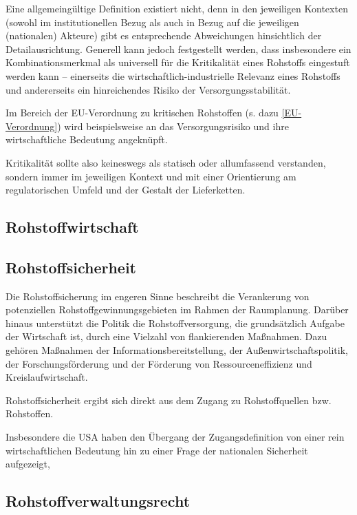 \documentclass[12pt,a4paper,oneside]{book} %
\begin{document}
	Eine allgemeingültige Definition existiert nicht, denn in den jeweiligen Kontexten (sowohl im institutionellen Bezug als auch in Bezug auf die jeweiligen (nationalen) Akteure) gibt es entsprechende Abweichungen hinsichtlich der Detailausrichtung. Generell kann jedoch festgestellt werden, dass insbesondere ein Kombinationsmerkmal als universell für die Kritikalität eines Rohstoffs eingestuft werden kann -- einerseits die wirtschaftlich-industrielle Relevanz eines Rohstoffs und andererseits ein hinreichendes Risiko der Versorgungsstabilität.
	
	
	Im Bereich der EU-Verordnung zu kritischen Rohstoffen (s. dazu \ref{EU-Verordnung}) wird beispielsweise an das Versorgungsrisiko und ihre wirtschaftliche Bedeutung angeknüpft.
	
	Kritikalität sollte also keineswegs als statisch oder allumfassend verstanden, sondern immer im jeweiligen Kontext und mit einer Orientierung am regulatorischen Umfeld und der Gestalt der Lieferketten. 
	
	
	
	\subsection{Rohstoffwirtschaft}
	
	\subsection{Rohstoffsicherheit}
	
	\glqq Die Rohstoffsicherung im engeren Sinne beschreibt die Verankerung von potenziellen Rohstoffgewinnungsgebieten im Rahmen der Raumplanung. Darüber hinaus unterstützt die Politik die Rohstoffversorgung, die grundsätzlich Aufgabe der Wirtschaft ist, durch eine Vielzahl von flankierenden Maßnahmen. Dazu gehören Maßnahmen der Informationsbereitstellung, der Außenwirtschaftspolitik, der Forschungsförderung und der Förderung von Ressourceneffizienz und Kreislaufwirtschaft. \grqq \autocite{Bericht zur Rohstoffsituation in Deutschland 2023}
	
	Rohstoffsicherheit ergibt sich direkt aus dem Zugang zu Rohstoffquellen bzw. Rohstoffen. 
	
	Insbesondere die USA haben den Übergang der Zugangsdefinition von einer rein wirtschaftlichen Bedeutung hin zu einer Frage der nationalen Sicherheit aufgezeigt,
	
	
	
	\subsection{Rohstoffverwaltungsrecht}
	
\end{document}
